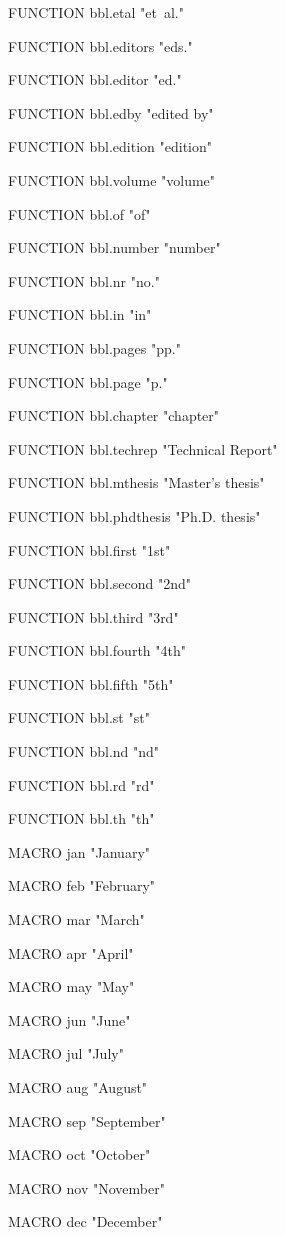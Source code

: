 FUNCTION {bbl.etal}
{ "et~al." }

FUNCTION {bbl.editors}
{ "eds." }

FUNCTION {bbl.editor}
{ "ed." }

FUNCTION {bbl.edby}
{ "edited by" }

FUNCTION {bbl.edition}
{ "edition" }

FUNCTION {bbl.volume}
{ "volume" }

FUNCTION {bbl.of}
{ "of" }

FUNCTION {bbl.number}
{ "number" }

FUNCTION {bbl.nr}
{ "no." }

FUNCTION {bbl.in}
{ "in" }

FUNCTION {bbl.pages}
{ "pp." }

FUNCTION {bbl.page}
{ "p." }

FUNCTION {bbl.chapter}
{ "chapter" }

FUNCTION {bbl.techrep}
{ "Technical Report" }

FUNCTION {bbl.mthesis}
{ "Master's thesis" }

FUNCTION {bbl.phdthesis}
{ "Ph.D. thesis" }

FUNCTION {bbl.first}
{ "1st" }

FUNCTION {bbl.second}
{ "2nd" }

FUNCTION {bbl.third}
{ "3rd" }

FUNCTION {bbl.fourth}
{ "4th" }

FUNCTION {bbl.fifth}
{ "5th" }

FUNCTION {bbl.st}
{ "st" }

FUNCTION {bbl.nd}
{ "nd" }

FUNCTION {bbl.rd}
{ "rd" }

FUNCTION {bbl.th}
{ "th" }

MACRO {jan} {"January"}

MACRO {feb} {"February"}

MACRO {mar} {"March"}

MACRO {apr} {"April"}

MACRO {may} {"May"}

MACRO {jun} {"June"}

MACRO {jul} {"July"}

MACRO {aug} {"August"}

MACRO {sep} {"September"}

MACRO {oct} {"October"}

MACRO {nov} {"November"}

MACRO {dec} {"December"}

